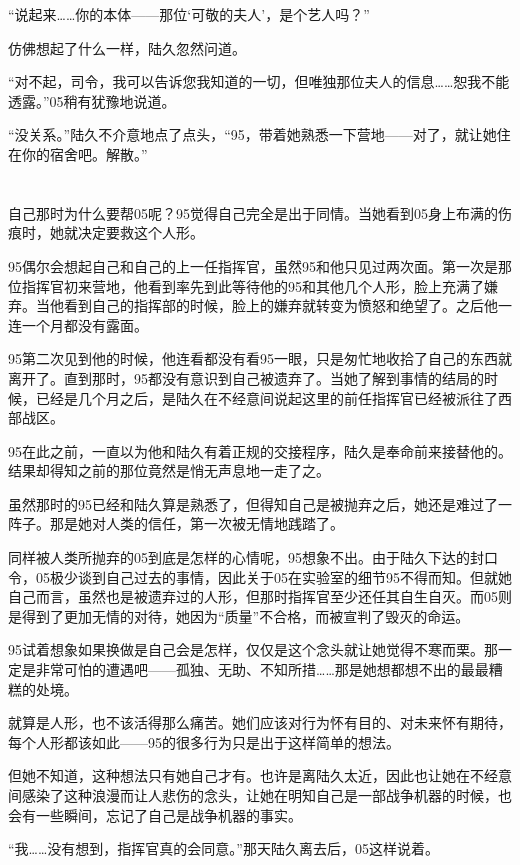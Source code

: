 “说起来……你的本体——那位‘可敬的夫人’，是个艺人吗？”

仿佛想起了什么一样，陆久忽然问道。

“对不起，司令，我可以告诉您我知道的一切，但唯独那位夫人的信息……恕我不能透露。”05稍有犹豫地说道。

“没关系。”陆久不介意地点了点头，“95，带着她熟悉一下营地——对了，就让她住在你的宿舍吧。解散。”

\section*{}

自己那时为什么要帮05呢？95觉得自己完全是出于同情。当她看到05身上布满的伤痕时，她就决定要救这个人形。

95偶尔会想起自己和自己的上一任指挥官，虽然95和他只见过两次面。第一次是那位指挥官初来营地，他看到率先到此等待他的95和其他几个人形，脸上充满了嫌弃。当他看到自己的指挥部的时候，脸上的嫌弃就转变为愤怒和绝望了。之后他一连一个月都没有露面。

95第二次见到他的时候，他连看都没有看95一眼，只是匆忙地收拾了自己的东西就离开了。直到那时，95都没有意识到自己被遗弃了。当她了解到事情的结局的时候，已经是几个月之后，是陆久在不经意间说起这里的前任指挥官已经被派往了西部战区。

95在此之前，一直以为他和陆久有着正规的交接程序，陆久是奉命前来接替他的。结果却得知之前的那位竟然是悄无声息地一走了之。

虽然那时的95已经和陆久算是熟悉了，但得知自己是被抛弃之后，她还是难过了一阵子。那是她对人类的信任，第一次被无情地践踏了。

同样被人类所抛弃的05到底是怎样的心情呢，95想象不出。由于陆久下达的封口令，05极少谈到自己过去的事情，因此关于05在实验室的细节95不得而知。但就她自己而言，虽然也是被遗弃过的人形，但那时指挥官至少还任其自生自灭。而05则是得到了更加无情的对待，她因为“质量”不合格，而被宣判了毁灭的命运。

95试着想象如果换做是自己会是怎样，仅仅是这个念头就让她觉得不寒而栗。那一定是非常可怕的遭遇吧——孤独、无助、不知所措……那是她想都想不出的最最糟糕的处境。

就算是人形，也不该活得那么痛苦。她们应该对行为怀有目的、对未来怀有期待，每个人形都该如此——95的很多行为只是出于这样简单的想法。

但她不知道，这种想法只有她自己才有。也许是离陆久太近，因此也让她在不经意间感染了这种浪漫而让人悲伤的念头，让她在明知自己是一部战争机器的时候，也会有一些瞬间，忘记了自己是战争机器的事实。

“我……没有想到，指挥官真的会同意。”那天陆久离去后，05这样说着。

